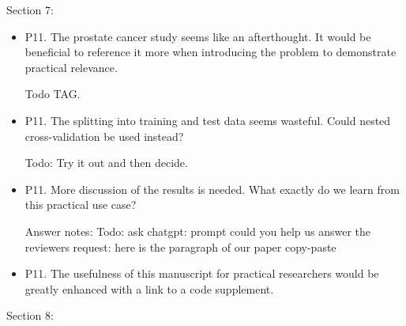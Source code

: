 \documentclass[a4paper,danish]{article}
\newcommand{\1}{\mathds{1}}
\newcommand{\answer}[1]{{\vspace{1em}{\bf #1}\vspace{1em}}}
\begin{document}
Section 7:

\begin{itemize}
\item P11. The prostate cancer study seems like an afterthought. It would
be beneficial to reference it more when introducing the problem to
demonstrate practical relevance.

Todo TAG.

\item P11. The splitting into training and test data seems wasteful. Could
nested cross-validation be used instead?

Todo: Try it out and then decide.

\item P11. More discussion of the results is needed. What exactly do we
learn from this practical use case?

Answer notes: Todo: ask chatgpt: prompt could you help us answer the
reviewers request: here is the paragraph of our paper copy-paste

\item P11. The usefulness of this manuscript for practical researchers
would be greatly enhanced with a link to a code supplement.

\answer{A code supplement is provided at the Github repository that is
  referenced at the end of the Introduction, please also see our
  answer to you comment to Section 4, page 6.}
\end{itemize}


Section 8:
\end{document}
